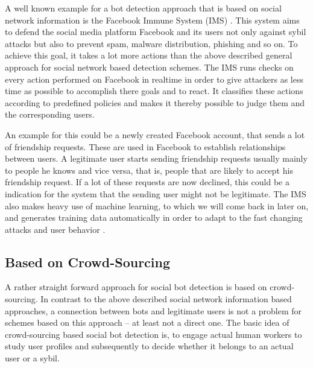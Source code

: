 A well known example for a bot detection approach that is based on social network information is the Facebook Immune System (IMS) \cite{fis}. This system aims to defend the social media platform Facebook and its users not only against sybil attacks but also to prevent spam, malware distribution, phishing and so on.  To achieve this goal, it takes a lot more actions than the above described general approach for social network based detection schemes. The IMS runs checks on every action performed on Facebook in realtime in order to give attackers as less time as possible to accomplish there goals and to react. It classifies these actions according to predefined policies and makes it thereby possible to judge them and the corresponding users.

An example for this could be a newly created Facebook account, that sends a lot of friendship requests. These are used in Facebook to establish relationships between users. A legitimate user starts sending friendship requests usually mainly to people he knows and vice versa, that is, people that are likely to accept his friendship request. If a lot of these requests are now declined, this could be a indication for the system that the sending user might not be legitimate.  The IMS also makes heavy use of machine learning, to which we will come back in later on, and generates training data automatically in order to adapt to the fast changing attacks and user behavior \cite{fis}.

\subsection{Based on Crowd-Sourcing}
A rather straight forward approach for social bot detection is based on crowd-sourcing. In contrast to the above described social network information based approaches, a connection between bots and legitimate users is not a problem for schemes based on this approach -- at least not a direct one. The basic idea of crowd-sourcing based social bot detection is, to engage actual human workers to study user profiles and subsequently to decide whether it belongs to an actual user or a sybil.

